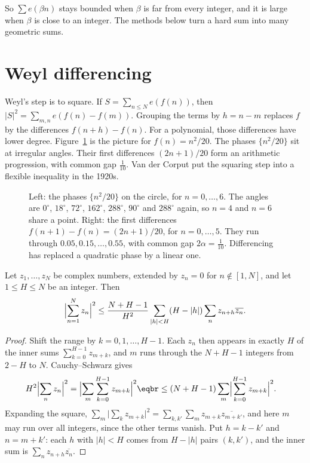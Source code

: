 So $\sum e(\beta n)$ stays bounded when $\beta$ is far from every integer, and it is large when $\beta$ is close to an integer. The methods below turn a hard sum into many geometric sums.

\section{Weyl differencing}

Weyl's step is to square. If $S=\sum_{n\le N}e(f(n))$, then $|S|^2=\sum_{m,n}e(f(n)-f(m))$. Grouping the terms by $h=n-m$ replaces $f$ by the differences $f(n+h)-f(n)$. For a polynomial, those differences have lower degree. Figure~\ref{fig:weylshift} is the picture for $f(n)=n^2/20$. The phases $\{n^2/20\}$ sit at irregular angles. Their first differences $(2n+1)/20$ form an arithmetic progression, with common gap $\frac1{10}$. Van der Corput put the squaring step into a flexible inequality in the 1920s.

\begin{figure}[ht]
\centering
{}
\caption{Left: the phases $\{n^2/20\}$ on the circle, for $n=0,\dots,6$. The angles are $0^\circ$, $18^\circ$, $72^\circ$, $162^\circ$, $288^\circ$, $90^\circ$ and $288^\circ$ again, so $n=4$ and $n=6$ share a point. Right: the first differences $f(n+1)-f(n)=(2n+1)/20$, for $n=0,\dots,5$. They run through $0.05,0.15,\dots,0.55$, with common gap $2\alpha=\frac1{10}$. Differencing has replaced a quadratic phase by a linear one.}
\label{fig:weylshift}
\end{figure}

\begin{lemma}\label{lem:vdc}
Let $z_1,\dots,z_N$ be complex numbers, extended by $z_n=0$ for $n\notin[1,N]$, and let $1\le H\le N$ be an integer. Then
\[
\Bigl|\sum_{n=1}^Nz_n\Bigr|^2\le\frac{N+H-1}{H^2}\sum_{|h|<H}(H-|h|)\sum_nz_{n+h}\overline{z_n}.
\]
\end{lemma}

\begin{proof}
Shift the range by $k=0,1,\dots,H-1$. Each $z_n$ then appears in exactly $H$ of the inner sums $\sum_{k=0}^{H-1}z_{m+k}$, and $m$ runs through the $N+H-1$ integers from $2-H$ to $N$. Cauchy--Schwarz gives
\[
\begin{aligned}H^2\Bigl|\sum_nz_n\Bigr|^2&=\Bigl|\sum_m\sum_{k=0}^{H-1}z_{m+k}\Bigr|^2\eqbr\le(N+H-1)\sum_m\Bigl|\sum_{k=0}^{H-1}z_{m+k}\Bigr|^2.\end{aligned}
\]
Expanding the square, $\sum_m\bigl|\sum_kz_{m+k}\bigr|^2=\sum_{k,k'}\sum_mz_{m+k}\overline{z_{m+k'}}$, and here $m$ may run over all integers, since the other terms vanish. Put $h=k-k'$ and $n=m+k'$: each
$h$ with $|h|<H$ comes from $H-|h|$ pairs $(k,k')$, and the inner sum is $\sum_nz_{n+h}\overline{z_n}$.
\end{proof}

